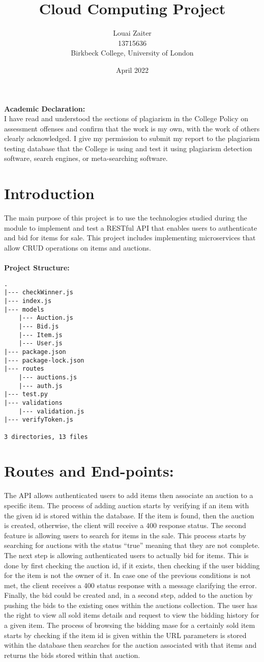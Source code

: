 \documentclass[12pt]{article}
\title{Cloud Computing Project}
\author{Louai Zaiter\\ 13715636\\ Birkbeck College, University of London}
\date{April 2022}
\begin{document}
\maketitle

\textbf{Academic Declaration:} 
\\
I have read and understood the sections of plagiarism in the College Policy on assessment offenses and confirm that the work is my own, with the work of others clearly acknowledged. I give my permission to submit my report to the plagiarism testing database that the College is using and test it using plagiarism detection software, search engines, or meta-searching software.
\newpage
\section{Introduction}
The main purpose of this project is to use the technologies studied during the module to implement and test a RESTful API that enables users to authenticate and bid for items for sale. This project includes implementing microservices that allow CRUD operations on items and auctions.
\\
\\
\textbf{Project Structure:}
\begin{lstlisting}
.
|--- checkWinner.js
|--- index.js
|--- models
    |--- Auction.js
    |--- Bid.js
    |--- Item.js
    |--- User.js
|--- package.json
|--- package-lock.json
|--- routes
    |--- auctions.js
    |--- auth.js
|--- test.py
|--- validations
    |--- validation.js
|--- verifyToken.js

3 directories, 13 files
\end{lstlisting}
\newpage
\section{Routes and End-points:}
The API allows authenticated users to add items then associate an auction to a specific item. The process of adding auction starts by verifying if an item with the given id is stored within the database. If the item is found, then the auction is created, otherwise, the client will receive a 400 response status. The second feature is allowing users to search for items in the sale. This process starts by searching for auctions with the status “true” meaning that they are not complete. The next step is allowing authenticated users to actually bid for items. This is done by first checking the auction id, if it exists, then checking if the user bidding for the item is not the owner of it. In case one of the previous conditions is not met, the client receives a 400 status response with a message clarifying the error. Finally, the bid could be created and, in a second step, added to the auction by pushing the bids to the existing ones within the auctions collection. The user has the right to view all sold items details and request to view the bidding history for a given item. The process of browsing the bidding mase for a certainly sold item starts by checking if the item id is given within the URL parameters is stored within the database then searches for the auction associated with that items and returns the bids stored within that auction.\\
\end{document}
